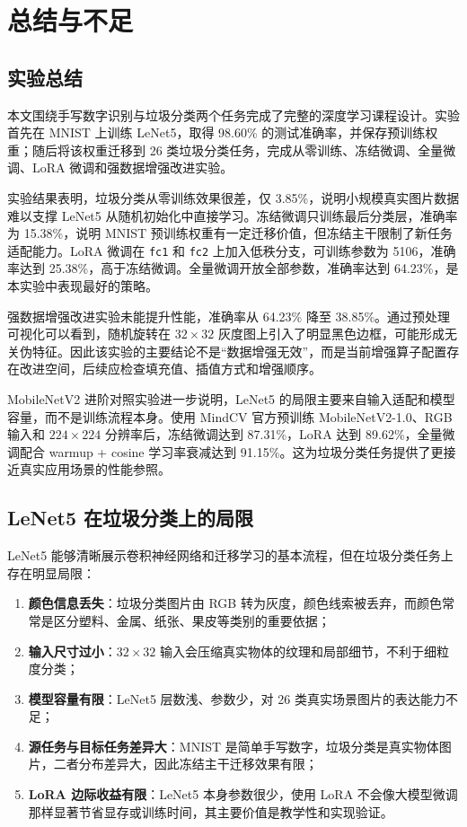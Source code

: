 \chapter{总结与不足}\label{chap:conclusion}

\section{实验总结}

本文围绕手写数字识别与垃圾分类两个任务完成了完整的深度学习课程设计。实验首先在 MNIST 上训练 LeNet5，取得 98.60\% 的测试准确率，并保存预训练权重；随后将该权重迁移到 26 类垃圾分类任务，完成从零训练、冻结微调、全量微调、LoRA 微调和强数据增强改进实验。

实验结果表明，垃圾分类从零训练效果很差，仅 3.85\%，说明小规模真实图片数据难以支撑 LeNet5 从随机初始化中直接学习。冻结微调只训练最后分类层，准确率为 15.38\%，说明 MNIST 预训练权重有一定迁移价值，但冻结主干限制了新任务适配能力。LoRA 微调在 \texttt{fc1} 和 \texttt{fc2} 上加入低秩分支，可训练参数为 5106，准确率达到 25.38\%，高于冻结微调。全量微调开放全部参数，准确率达到 64.23\%，是本实验中表现最好的策略。

强数据增强改进实验未能提升性能，准确率从 64.23\% 降至 38.85\%。通过预处理可视化可以看到，随机旋转在 $32\times32$ 灰度图上引入了明显黑色边框，可能形成无关伪特征。因此该实验的主要结论不是“数据增强无效”，而是当前增强算子配置存在改进空间，后续应检查填充值、插值方式和增强顺序。

MobileNetV2 进阶对照实验进一步说明，LeNet5 的局限主要来自输入适配和模型容量，而不是训练流程本身。使用 MindCV 官方预训练 MobileNetV2-1.0、RGB 输入和 $224\times224$ 分辨率后，冻结微调达到 87.31\%，LoRA 达到 89.62\%，全量微调配合 warmup + cosine 学习率衰减达到 91.15\%。这为垃圾分类任务提供了更接近真实应用场景的性能参照。

\section{LeNet5 在垃圾分类上的局限}

LeNet5 能够清晰展示卷积神经网络和迁移学习的基本流程，但在垃圾分类任务上存在明显局限：

\begin{enumerate}[label=(\arabic*)]
  \item \textbf{颜色信息丢失}：垃圾分类图片由 RGB 转为灰度，颜色线索被丢弃，而颜色常常是区分塑料、金属、纸张、果皮等类别的重要依据；
  \item \textbf{输入尺寸过小}：$32\times32$ 输入会压缩真实物体的纹理和局部细节，不利于细粒度分类；
  \item \textbf{模型容量有限}：LeNet5 层数浅、参数少，对 26 类真实场景图片的表达能力不足；
  \item \textbf{源任务与目标任务差异大}：MNIST 是简单手写数字，垃圾分类是真实物体图片，二者分布差异大，因此冻结主干迁移效果有限；
  \item \textbf{LoRA 边际收益有限}：LeNet5 本身参数很少，使用 LoRA 不会像大模型微调那样显著节省显存或训练时间，其主要价值是教学性和实现验证。
\end{enumerate}

